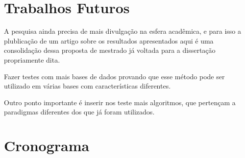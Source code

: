 \section{Trabalhos Futuros}\label{cap:fut}

A pesquisa ainda precisa de mais divulgação na esfera acadêmica, e para isso a plublicação de um artigo sobre os resultados apresentados aqui é uma consolidação dessa proposta de mestrado já voltada para a dissertação propriamente dita.

Fazer testes com mais bases de dados  provando que esse método pode ser utilizado em várias bases com características  diferentes.

Outro ponto importante é inserir nos teste mais algoritmos, que pertençam a  paradigmas diferentes dos que já foram utilizados.




\section{Cronograma}\label{cap:cron}

